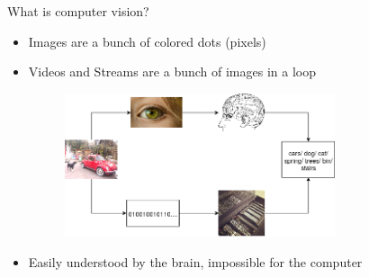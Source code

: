 \begin{frame}{What is computer vision?}
    \begin{itemize}
        \item Images are a bunch of colored dots (pixels)
        \item Videos and Streams are a bunch of images in a loop
        \begin{figure}
            \begin{center}
                \includegraphics[width=0.75\textwidth]{images/Recoginition_Process.png}\cite{eye, brain, server}
            \end{center}
        \end{figure}
        \item Easily understood by the brain, impossible for the computer 
    \end{itemize}
\end{frame}

